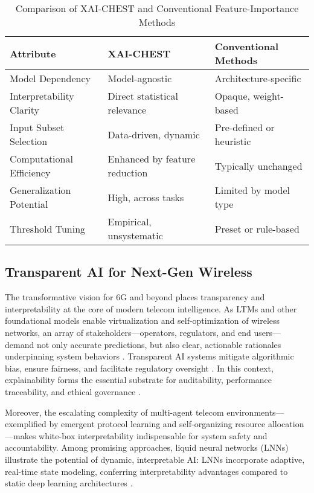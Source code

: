 \documentclass[sigconf]{acmart}
\begin{document}
\begin{table*}[htbp]
\centering
\caption{Comparison of XAI-CHEST and Conventional Feature-Importance Methods}
\label{tab:xai_chest_summary}
\begin{adjustbox}{max width=\textwidth}
\begin{tabular}{lll}
\toprule
\textbf{Attribute} & \textbf{XAI-CHEST} & \textbf{Conventional Methods} \\
\midrule
Model Dependency & Model-agnostic & Architecture-specific \\
Interpretability Clarity & Direct statistical relevance & Opaque, weight-based \\
Input Subset Selection & Data-driven, dynamic & Pre-defined or heuristic \\
Computational Efficiency & Enhanced by feature reduction & Typically unchanged \\
Generalization Potential & High, across tasks & Limited by model type \\
Threshold Tuning & Empirical, unsystematic & Preset or rule-based \\
\bottomrule
\end{tabular}
\end{adjustbox}
\end{table*}

\subsection{Transparent AI for Next-Gen Wireless}

The transformative vision for 6G and beyond places transparency and interpretability at the core of modern telecom intelligence. As LTMs and other foundational models enable virtualization and self-optimization of wireless networks, an array of stakeholders—operators, regulators, and end users—demand not only accurate predictions, but also clear, actionable rationales underpinning system behaviors \cite{ref41}. Transparent AI systems mitigate algorithmic bias, ensure fairness, and facilitate regulatory oversight \cite{ref7}. In this context, explainability forms the essential substrate for auditability, performance traceability, and ethical governance \cite{ref7}\cite{ref8}\cite{ref9}\cite{ref26}\cite{ref33}\cite{ref35}\cite{ref38}\cite{ref41}.

Moreover, the escalating complexity of multi-agent telecom environments—exemplified by emergent protocol learning and self-organizing resource allocation—makes white-box interpretability indispensable for system safety and accountability. Among promising approaches, liquid neural networks (LNNs) illustrate the potential of dynamic, interpretable AI: LNNs incorporate adaptive, real-time state modeling, conferring interpretability advantages compared to static deep learning architectures \cite{ref35}.
\end{document}
